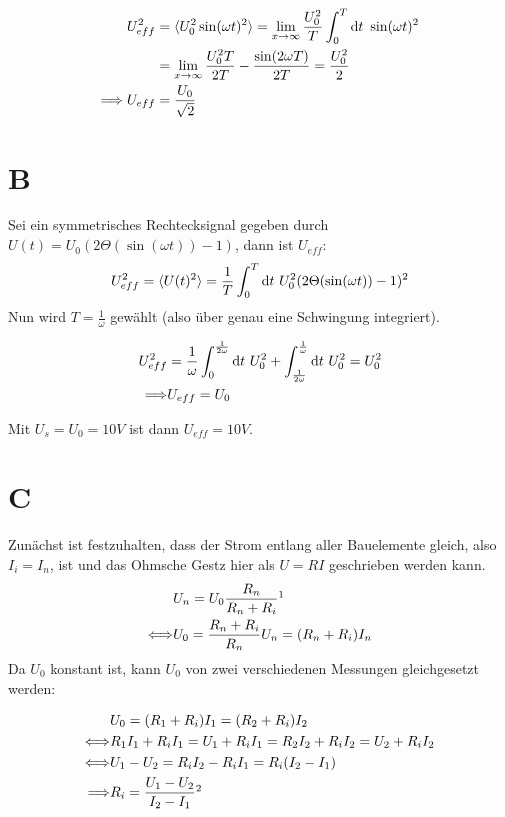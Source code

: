 \begin{align*}
	U_{eff}^2 &= \langle U_0^2 \sin(\omega t)^2 \rangle = \lim_{x\to\infty} \frac{U_0^2}{T} \int_0^T \text{d}t\text{ } \sin(\omega t)^2\\
	&= \lim_{x\to\infty} \frac{U_0^2 T}{2 T} - \frac{\sin(2 \omega T)}{2 T} = \frac{U_0^2}{2}\\
	\Longrightarrow U_{eff} &= \frac{U_0}{\sqrt{2}}
\end{align*}

\section{B}
Sei ein symmetrisches Rechtecksignal gegeben durch $U(t) = U_0 (2 \Theta(\sin(\omega t)) - 1)$, dann ist $U_{eff}$:
\begin{align*}
	U_{eff}^2 = \langle U(t)^2 \rangle = \frac{1}{T} \int_0^T \text{d}t\text{ } U_0^2 (2 \Theta(\sin(\omega t)) - 1)^2
\end{align*}
Nun wird $T = \frac{1}{\omega}$ gewählt (also über genau eine Schwingung integriert).

\begin{align*}
	U_{eff}^2 &= \frac{1}{\omega}\int_0^{\frac{1}{2\omega}} \text{d}t\text{ } U_0^2 + \int_{\frac{1}{2\omega}}^{\frac{1}{\omega}} \text{d}t\text{ } U_0^2 = U_0^2 \\ \Longrightarrow& U_{eff} = U_0
\end{align*}

Mit $U_s = U_0 = 10V$ ist dann $U_{eff} = 10V$.


\section{C}
Zunächst ist festzuhalten, dass der Strom entlang aller Bauelemente gleich, also $I_i = I_n$, ist und das Ohmsche Gestz hier als $U = R I$ geschrieben werden kann.
\begin{align*}
	&U_n = U_0 \frac{R_n}{R_n + R_i} \sgl{0.1}\\
	\equiv& U_0 = \frac{R_n + R_i}{R_n} U_n = (R_n + R_i) I_n
\end{align*}
Da $U_0$ konstant ist, kann $U_0$ von zwei verschiedenen Messungen gleichgesetzt werden:

\begin{align*}
	&U_0 = (R_1 + R_i) I_1 = (R_2 + R_i) I_2\\
	\equiv& R_1 I_1 + R_i I_1 = U_1 + R_i I_1 = R_2 I_2 + R_i I_2 = U_2 + R_i I_2\\
	\equiv& U_1 - U_2 = R_i I_2 - R_i I_1 = R_i (I_2 - I_1)\\
	\imply& R_i = \frac{U_1 - U_2}{I_2 - I_1} \sgl{0.2}
\end{align*}

